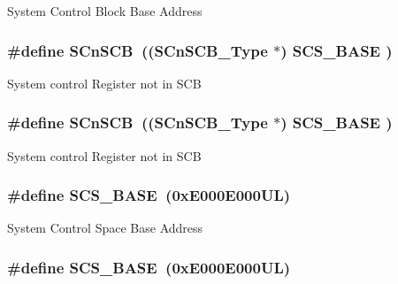 System Control Block Base Address \hypertarget{group___c_m_s_i_s__core__register_ga9fe0cd2eef83a8adad94490d9ecca63f}{
\subsubsection[{S\-Cn\-S\-C\-B}]{\setlength{\rightskip}{0pt plus 5cm}\#define S\-Cn\-S\-C\-B~(({\bf S\-Cn\-S\-C\-B\-\_\-\-Type}    $\ast$)     {\bf S\-C\-S\-\_\-\-B\-A\-S\-E}      )}}\label{group___c_m_s_i_s__core__register_ga9fe0cd2eef83a8adad94490d9ecca63f}
System control Register not in S\-C\-B \hypertarget{group___c_m_s_i_s__core__register_ga9fe0cd2eef83a8adad94490d9ecca63f}{
\subsubsection[{S\-Cn\-S\-C\-B}]{\setlength{\rightskip}{0pt plus 5cm}\#define S\-Cn\-S\-C\-B~(({\bf S\-Cn\-S\-C\-B\-\_\-\-Type}    $\ast$)     {\bf S\-C\-S\-\_\-\-B\-A\-S\-E}      )}}\label{group___c_m_s_i_s__core__register_ga9fe0cd2eef83a8adad94490d9ecca63f}
System control Register not in S\-C\-B \hypertarget{group___c_m_s_i_s__core__register_ga3c14ed93192c8d9143322bbf77ebf770}{
\subsubsection[{S\-C\-S\-\_\-\-B\-A\-S\-E}]{\setlength{\rightskip}{0pt plus 5cm}\#define S\-C\-S\-\_\-\-B\-A\-S\-E~(0x\-E000\-E000\-U\-L)}}\label{group___c_m_s_i_s__core__register_ga3c14ed93192c8d9143322bbf77ebf770}
System Control Space Base Address \hypertarget{group___c_m_s_i_s__core__register_ga3c14ed93192c8d9143322bbf77ebf770}{
\subsubsection[{S\-C\-S\-\_\-\-B\-A\-S\-E}]{\setlength{\rightskip}{0pt plus 5cm}\#define S\-C\-S\-\_\-\-B\-A\-S\-E~(0x\-E000\-E000\-U\-L)}}\label{group___c_m_s_i_s__core__register_ga3c14ed93192c8d9143322bbf77ebf770}
